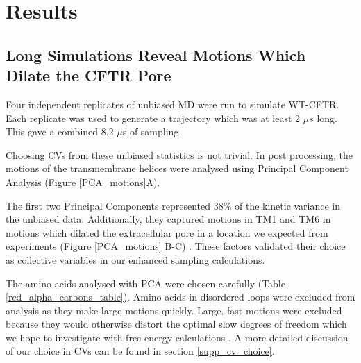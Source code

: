 \section{Results}

\subsection{Long Simulations Reveal Motions Which Dilate the CFTR Pore}
Four independent replicates of unbiased MD were run to simulate WT-CFTR. Each replicate was used to generate a trajectory which was at least 2 $\mu s$ long. This gave a combined 8.2 $\mu$s of sampling. 

Choosing CVs from these unbiased statistics is not trivial. In post processing, the motions of the transmembrane helices were analysed using Principal Component Analysis \cite{pearson1901, hotelling1936} (Figure \ref{PCA_motions}A). 

The first two Principal Components represented 38\% of the kinetic variance in the unbiased data. Additionally, they captured motions in TM1 and TM6 in motions which dilated the extracellular pore in a location we expected from experiments (Figure \ref{PCA_motions} B-C) \cite{linsdell2018, negoda2018, negoda2019}. These factors validated their choice as collective variables in our enhanced sampling calculations.  

The amino acids analysed with PCA were chosen carefully (Table \ref{red_alpha_carbons_table}). Amino acids in disordered loops were excluded from analysis as they make large motions quickly. Large, fast motions were excluded because they would otherwise distort the optimal slow degrees of freedom which we hope to investigate with free energy calculations \cite{noe2001}. A more detailed discussion of our choice in CVs can be found in section \ref{supp_cv_choice}.

